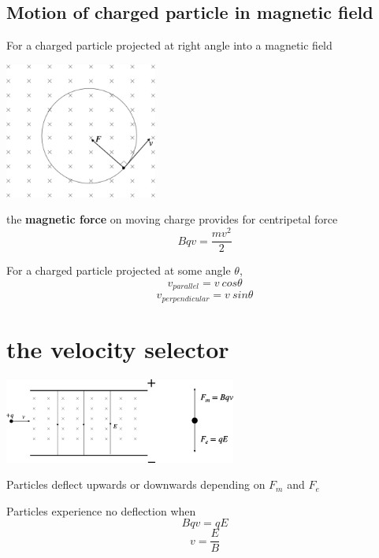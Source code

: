 \documentclass[a4paper, 10pt]{article}
\begin{document}
\subsection{Motion of charged particle in magnetic field}
For a charged particle projected at right angle into a magnetic field \\
\begin{minipage}{0.5\textwidth}
   \begin{center}
      \includegraphics[width=5cm]{figures/8.pdf} 
   \end{center}	
\end{minipage}
\begin{minipage}{0.5\textwidth}
   the \textbf{magnetic force} on moving charge provides for centripetal force
   \[
      Bqv = \frac{mv^2}{2}
   \]
\end{minipage}

For a charged particle projected at some angle $\theta$, 
\[
   v_{parallel} = v\ cos\theta
\]
\[
   v_{perpendicular} = v\ sin \theta
\]


\section{the velocity selector}
\begin{center}
   \includegraphics[width=3in]{figures/9.pdf} 
\end{center}	
Particles deflect upwards or downwards depending on $F_m$ and $F_e$

Particles experience no deflection when
\[
Bqv = qE
\]
\[
v = \frac{E}{B}
\]
\end{document}
